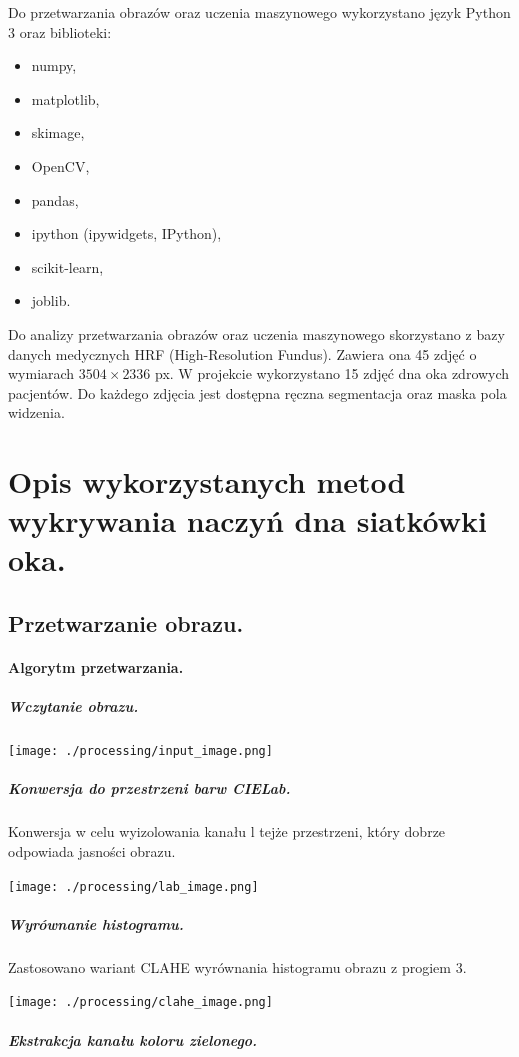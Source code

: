 \documentclass[a4paper, 11pt]{article}
\begin{document}
Do przetwarzania obrazów oraz uczenia maszynowego wykorzystano język Python 3 oraz biblioteki:

\begin{itemize}
	\item numpy,
	\item matplotlib,
	\item skimage,
	\item OpenCV,
	\item pandas,
	\item ipython (ipywidgets, IPython),
	\item scikit-learn,
	\item joblib.
\end{itemize}


Do analizy przetwarzania obrazów oraz uczenia maszynowego skorzystano z bazy danych medycznych HRF (High-Resolution Fundus). Zawiera ona 45 zdjęć o wymiarach $3504\times2336$ px.
W projekcie wykorzystano 15 zdjęć dna oka zdrowych pacjentów. Do każdego zdjęcia jest dostępna ręczna segmentacja oraz maska pola widzenia.


\newpage

\section{Opis wykorzystanych metod wykrywania naczyń dna siatkówki oka.}
\subsection{Przetwarzanie obrazu.}
\paragraph{Algorytm przetwarzania.}
\subparagraph{Wczytanie obrazu.}
\begin{center}
	\texttt{[image: ./processing/input\_image.png]}
\end{center}

\subparagraph{Konwersja do przestrzeni barw CIELab.}


Konwersja w celu wyizolowania kanału l tejże przestrzeni, który dobrze odpowiada jasności obrazu.
\begin{center}
	\texttt{[image: ./processing/lab\_image.png]}
\end{center}

\newpage
\subparagraph{Wyrównanie histogramu.}


Zastosowano wariant CLAHE wyrównania histogramu obrazu z progiem 3.
\begin{center}
	\texttt{[image: ./processing/clahe\_image.png]}
\end{center}
\subparagraph{Ekstrakcja kanału koloru zielonego.}
\end{document}
